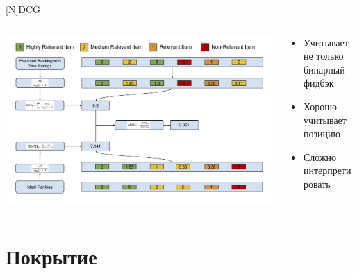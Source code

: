 \documentclass[11pt,aspectratio=169,handout]{beamer}
\begin{document}
\begin{frame}{[N]DCG}

\begin{columns}
\begin{column}{0.5\textwidth}
   \begin{center}
		\includegraphics[scale=0.055]{images/ndcg.png}
   \end{center}
\end{column}
\begin{column}{0.4\textwidth}
    \begin{tcolorbox}[colback=info!5,colframe=info!80,title=]
      \begin{itemize}
      \item Учитывает не только бинарный фидбэк
      \item Хорошо учитывает позицию
      \end{itemize}
    \end{tcolorbox}
    \begin{tcolorbox}[colback=warn!5,colframe=warn!80,title=]
      \begin{itemize}
      \item Сложно интерпретировать
      \end{itemize}
    \end{tcolorbox}
\end{column}
\end{columns}

\end{frame}

\section{Покрытие}
\end{document}
